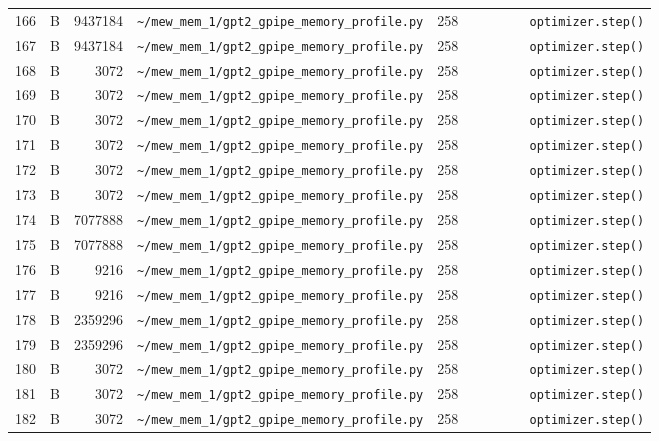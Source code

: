 \documentclass{article}
\begin{document}
\begin{longtable}{r l r p{6.5cm} r p{7.0cm}}
166 & B & 9437184 & \lstinline|~/mew_mem_1/gpt2_gpipe_memory_profile.py| & 258 & \lstinline|        optimizer.step()| \\
167 & B & 9437184 & \lstinline|~/mew_mem_1/gpt2_gpipe_memory_profile.py| & 258 & \lstinline|        optimizer.step()| \\
168 & B & 3072 & \lstinline|~/mew_mem_1/gpt2_gpipe_memory_profile.py| & 258 & \lstinline|        optimizer.step()| \\
169 & B & 3072 & \lstinline|~/mew_mem_1/gpt2_gpipe_memory_profile.py| & 258 & \lstinline|        optimizer.step()| \\
170 & B & 3072 & \lstinline|~/mew_mem_1/gpt2_gpipe_memory_profile.py| & 258 & \lstinline|        optimizer.step()| \\
171 & B & 3072 & \lstinline|~/mew_mem_1/gpt2_gpipe_memory_profile.py| & 258 & \lstinline|        optimizer.step()| \\
172 & B & 3072 & \lstinline|~/mew_mem_1/gpt2_gpipe_memory_profile.py| & 258 & \lstinline|        optimizer.step()| \\
173 & B & 3072 & \lstinline|~/mew_mem_1/gpt2_gpipe_memory_profile.py| & 258 & \lstinline|        optimizer.step()| \\
174 & B & 7077888 & \lstinline|~/mew_mem_1/gpt2_gpipe_memory_profile.py| & 258 & \lstinline|        optimizer.step()| \\
175 & B & 7077888 & \lstinline|~/mew_mem_1/gpt2_gpipe_memory_profile.py| & 258 & \lstinline|        optimizer.step()| \\
176 & B & 9216 & \lstinline|~/mew_mem_1/gpt2_gpipe_memory_profile.py| & 258 & \lstinline|        optimizer.step()| \\
177 & B & 9216 & \lstinline|~/mew_mem_1/gpt2_gpipe_memory_profile.py| & 258 & \lstinline|        optimizer.step()| \\
178 & B & 2359296 & \lstinline|~/mew_mem_1/gpt2_gpipe_memory_profile.py| & 258 & \lstinline|        optimizer.step()| \\
179 & B & 2359296 & \lstinline|~/mew_mem_1/gpt2_gpipe_memory_profile.py| & 258 & \lstinline|        optimizer.step()| \\
180 & B & 3072 & \lstinline|~/mew_mem_1/gpt2_gpipe_memory_profile.py| & 258 & \lstinline|        optimizer.step()| \\
181 & B & 3072 & \lstinline|~/mew_mem_1/gpt2_gpipe_memory_profile.py| & 258 & \lstinline|        optimizer.step()| \\
182 & B & 3072 & \lstinline|~/mew_mem_1/gpt2_gpipe_memory_profile.py| & 258 & \lstinline|        optimizer.step()| \\

\end{longtable}
\end{document}
